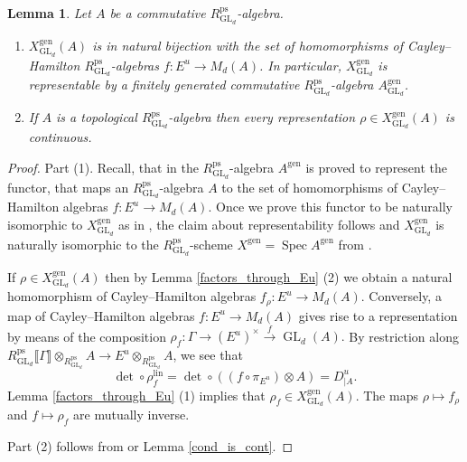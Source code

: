 \documentclass{amsart}
\newtheorem{lem}[prop]{Lemma}
\theoremstyle{definition}
\theoremstyle{remark}
\DeclareMathOperator{\GL}{GL}
\DeclareMathOperator{\Spec}{Spec}
\newcommand{\br}[1]{\llbracket #1\rrbracket}
\newcommand{\ps}{\mathrm{ps}}
\newcommand{\gen}{\mathrm{gen}}
\newcommand{\RpsGLd}{R^{\ps}_{\GL_d}}
\newcommand{\lin}{\mathrm{lin}}
\newcommand{\XgenGLd}{X^{\gen}_{\GL_d}}
\begin{document}
\begin{lem}\label{XgenGLdA}
    Let $A$ be a commutative $\RpsGLd$-algebra.
    \begin{enumerate}
        \item $\XgenGLd(A)$ is in natural bijection with the set of homomorphisms of Cayley--Hamilton $\RpsGLd$-algebras $f : E^u \to M_d(A)$. In particular, $\XgenGLd$ is representable by a finitely generated commutative $\RpsGLd$-algebra $A^{\gen}_{\GL_d}$.
        \item If $A$ is a topological $\RpsGLd$-algebra then every representation $\rho \in \XgenGLd(A)$ is continuous.
\end{enumerate}
\end{lem}

\begin{proof}
    Part (1). 
    Recall, that in \cite[Lemma 3.1]{BIP_new} the $\RpsGLd$-algebra $A^{\gen}$ is proved to represent the functor, that maps an $\RpsGLd$-algebra $A$ to the set of homomorphisms of Cayley--Hamilton algebras $f : E^u \to M_d(A)$. Once we prove this functor to be naturally isomorphic to $\XgenGLd$ as in , the claim about representability follows and $\XgenGLd$ is naturally isomorphic to the $\RpsGLd$-scheme $X^{\gen} = \Spec A^{\gen}$ from \cite{BIP_new}.
    
    If $\rho\in \XgenGLd(A)$ then by Lemma \ref{factors_through_Eu} (2) we obtain a natural 
    homomorphism of Cayley--Hamilton algebras $f_{\rho}: E^u \to M_d(A)$. 
    Conversely, a map of Cayley--Hamilton algebras $f : E^u \to M_d(A)$ gives rise to a representation by means of the composition
    $ \rho_f : \Gamma \to (E^u)^{\times} \overset{f}{\to} \GL_d(A). $
    By restriction along $\RpsGLd\br{\Gamma} \otimes_{\RpsGLd} A \to E^u \otimes_{\RpsGLd} A$, we see that
    $$ \det \circ \rho_f^{\lin} = \det \circ ((f \circ \pi_{E^u}) \otimes A) = D^u_{|A}. $$
    Lemma \ref{factors_through_Eu} (1) implies that $\rho_f\in \XgenGLd(A)$. 
    The maps $\rho\mapsto f_{\rho}$ and $f\mapsto \rho_f$ are mutually inverse. 
    
   

    Part (2) follows from \cite[Lemma 3.2]{BIP_new} or Lemma \ref{cond_is_cont}.
\end{proof}
\end{document}
